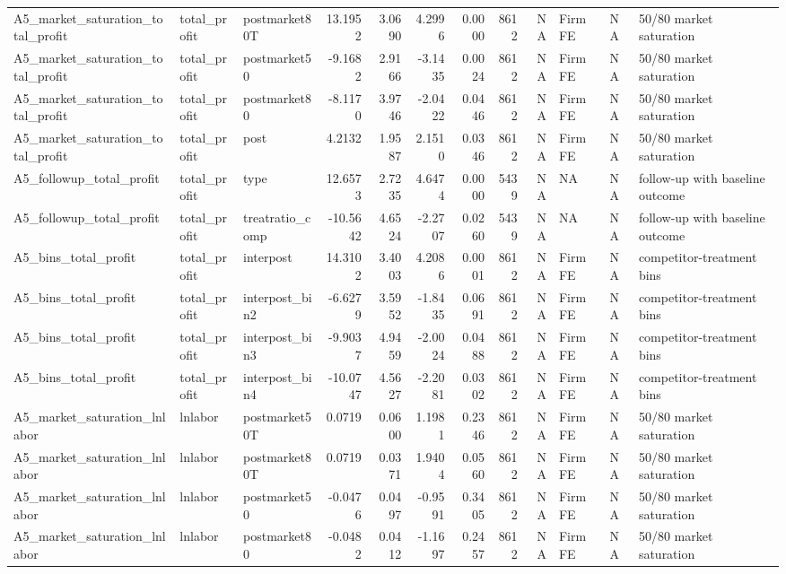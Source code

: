 \begin{table}
\begin{tabular}[t]{lllrrrrrrlll}
A5\_market\_saturation\_total\_profit & total\_profit & postmarket80T & 13.1952 & 3.0690 & 4.2996 & 0.0000 & 8612 & NA & Firm FE & NA & 50/80 market saturation\\
A5\_market\_saturation\_total\_profit & total\_profit & postmarket50 & -9.1682 & 2.9166 & -3.1435 & 0.0024 & 8612 & NA & Firm FE & NA & 50/80 market saturation\\
A5\_market\_saturation\_total\_profit & total\_profit & postmarket80 & -8.1170 & 3.9746 & -2.0422 & 0.0446 & 8612 & NA & Firm FE & NA & 50/80 market saturation\\
\addlinespace
A5\_market\_saturation\_total\_profit & total\_profit & post & 4.2132 & 1.9587 & 2.1510 & 0.0346 & 8612 & NA & Firm FE & NA & 50/80 market saturation\\
A5\_followup\_total\_profit & total\_profit & type & 12.6573 & 2.7235 & 4.6474 & 0.0000 & 5439 & NA & NA & NA & follow-up with baseline outcome\\
A5\_followup\_total\_profit & total\_profit & treatratio\_comp & -10.5642 & 4.6524 & -2.2707 & 0.0260 & 5439 & NA & NA & NA & follow-up with baseline outcome\\
A5\_bins\_total\_profit & total\_profit & interpost & 14.3102 & 3.4003 & 4.2086 & 0.0001 & 8612 & NA & Firm FE & NA & competitor-treatment bins\\
A5\_bins\_total\_profit & total\_profit & interpost\_bin2 & -6.6279 & 3.5952 & -1.8435 & 0.0691 & 8612 & NA & Firm FE & NA & competitor-treatment bins\\
\addlinespace
A5\_bins\_total\_profit & total\_profit & interpost\_bin3 & -9.9037 & 4.9459 & -2.0024 & 0.0488 & 8612 & NA & Firm FE & NA & competitor-treatment bins\\
A5\_bins\_total\_profit & total\_profit & interpost\_bin4 & -10.0747 & 4.5627 & -2.2081 & 0.0302 & 8612 & NA & Firm FE & NA & competitor-treatment bins\\
A5\_market\_saturation\_lnlabor & lnlabor & postmarket50T & 0.0719 & 0.0600 & 1.1981 & 0.2346 & 8612 & NA & Firm FE & NA & 50/80 market saturation\\
A5\_market\_saturation\_lnlabor & lnlabor & postmarket80T & 0.0719 & 0.0371 & 1.9404 & 0.0560 & 8612 & NA & Firm FE & NA & 50/80 market saturation\\
A5\_market\_saturation\_lnlabor & lnlabor & postmarket50 & -0.0476 & 0.0497 & -0.9591 & 0.3405 & 8612 & NA & Firm FE & NA & 50/80 market saturation\\
\addlinespace
A5\_market\_saturation\_lnlabor & lnlabor & postmarket80 & -0.0482 & 0.0412 & -1.1697 & 0.2457 & 8612 & NA & Firm FE & NA & 50/80 market saturation\\

\end{tabular}
\end{table}
